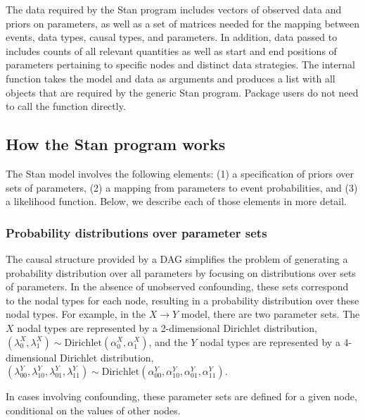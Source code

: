 \documentclass[
  11pt,
  article]{jss}
\renewcommand{\texttt}[1]{\code{#1}}
\begin{document}
The data required by the Stan program includes vectors of observed data
and priors on parameters, as well as a set of matrices needed for the
mapping between events, data types, causal types, and parameters. In
addition, data passed to \texttt{stan} includes counts of all relevant
quantities as well as start and end positions of parameters pertaining
to specific nodes and distinct data strategies. The internal function
\texttt{prep\_stan\_data()} takes the model and data as arguments and
produces a list with all objects that are required by the generic Stan
program. Package users do not need to call the
\texttt{prep\_stan\_data()} function directly.

\subsection{How the Stan program
works}\label{how-the-stan-program-works}

The Stan model involves the following elements: (1) a specification of
priors over sets of parameters, (2) a mapping from parameters to event
probabilities, and (3) a likelihood function. Below, we describe each of
those elements in more detail.

\subsubsection{Probability distributions over parameter
sets}\label{probability-distributions-over-parameter-sets}

The causal structure provided by a DAG simplifies the problem of
generating a probability distribution over all parameters by focusing on
distributions over sets of parameters. In the absence of unobserved
confounding, these sets correspond to the nodal types for each node,
resulting in a probability distribution over these nodal types. For
example, in the \(X \rightarrow Y\) model, there are two parameter sets.
The \(X\) nodal types are represented by a 2-dimensional Dirichlet
distribution,
\((\lambda^X_0, \lambda^X_1) \sim \text{Dirichlet}(\alpha^X_0, \alpha^X_1)\),
and the \(Y\) nodal types are represented by a \(4\)-dimensional
Dirichlet distribution,
\((\lambda^Y_{00}, \lambda^Y_{10}, \lambda^Y_{01}, \lambda^Y_{11}) \sim \text{Dirichlet}(\alpha^Y_{00}, \alpha^Y_{10}, \alpha^Y_{01}, \alpha^Y_{11})\).

In cases involving confounding, these parameter sets are defined for a
given node, conditional on the values of other nodes.
\end{document}
